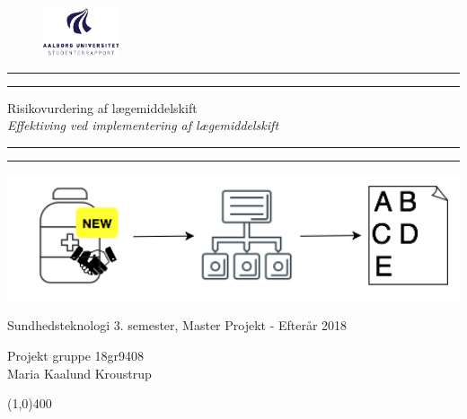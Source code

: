 \clearpage
\thispagestyle{empty}

\begin{figure}[H]
	\raggedleft
	\includegraphics[width=0.2\textwidth]{billeder/aau_logo_da.pdf}
\end{figure} 

\begin{center}	
	\rule{\textwidth}{1.6pt}\vspace*{-\baselineskip}\vspace*{2pt} %
	\rule{\textwidth}{0.4pt} %
	
	\vspace{0.75\baselineskip} %
	
	{\Huge Risikovurdering af lægemiddelskift} \\ \vspace{3mm}%
	{\Large\textit{Effektiving ved implementering af lægemiddelskift}}
	\vspace{0.75\baselineskip} %
	
	\rule{\textwidth}{0.4pt}\vspace*{-\baselineskip}\vspace{3.2pt} %
	\rule{\textwidth}{1.6pt} %
	
	\vspace{3.5\baselineskip} %
		\includegraphics[width=1\textwidth]{Statusseminar/statusforside.png} \\
		\vspace{3cm}
	 		\begin{Large}
	 		Sundhedsteknologi 3. semester, Master Projekt - Efterår 2018\\
		\vspace{1cm}
			\end{Large}
	{\large Projekt gruppe 18gr9408 \\
	Maria Kaalund Kroustrup}
\end{center}
\vspace*{\fill}

\begin{center}
	\line(1,0){400}
\end{center}



